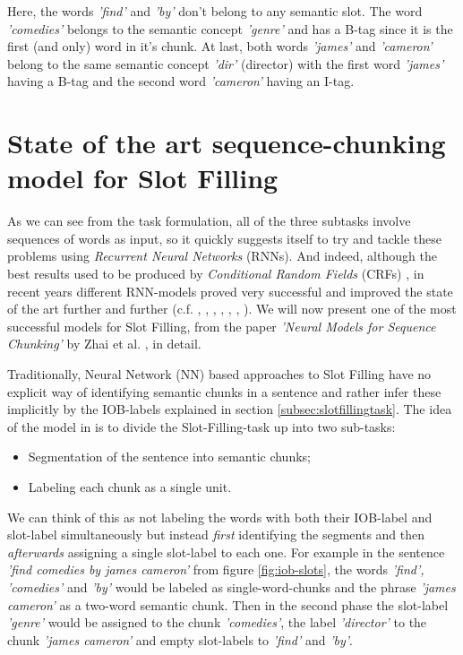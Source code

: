 \documentclass[twoside,11pt,a4paper]{article}
\theoremstyle{break}
\begin{document}
Here, the words \textit{'find'} and \textit{'by'} don't belong to any semantic slot. The word \textit{'comedies'} belongs to the semantic concept \textit{'genre'} and has a B-tag since it is the first (and only) word in it's chunk. At last, both words \textit{'james'} and \textit{'cameron'} belong to the same semantic concept \textit{'dir'} (director) with the first word \textit{'james'} having a B-tag and the second word \textit{'cameron'} having an I-tag.

%
%
%
%
\section{State of the art sequence-chunking model for Slot Filling}
As we can see from the task formulation, all of the three subtasks involve sequences of words as input, so it quickly suggests itself to try and tackle these problems using \textit{Recurrent Neural Networks} (RNNs). And indeed, although the best results used to be produced by \textit{Conditional Random Fields} (CRFs) \cite{raymond:2007}, in recent years different RNN-models proved very successful and improved the state of the art further and further (c.f. \cite{goo:2018}, \cite{kurata:2016}, \cite{mesnil:2015}, \cite{mesnil:2013}, \cite{yao:2013}, \cite{zhai:2017}, \cite{zhang:2016}). We will now present one of the most successful models for Slot Filling, from the paper \textit{'Neural Models for Sequence Chunking'} by Zhai et al. \cite{zhai:2017}, in detail.\par
Traditionally, Neural Network (NN) based approaches to Slot Filling have no explicit way of identifying semantic chunks in a sentence and rather infer these implicitly by the IOB-labels explained in section \ref{subsec:slotfillingtask}. The idea of the model in \cite{zhai:2017} is to divide the Slot-Filling-task up into two sub-tasks:
\begin{itemize}
	\item Segmentation of the sentence into semantic chunks;
	\item Labeling each chunk as a single unit.
\end{itemize}
We can think of this as not labeling the words with both their IOB-label and slot-label simultaneously but instead \textit{first} identifying the segments and then \textit{afterwards} assigning a single slot-label to each one. For example in the sentence \textit{'find comedies by james cameron'} from figure \ref{fig:iob-slots}, the words \textit{'find', 'comedies'} and \textit{'by'} would be labeled as single-word-chunks and the phrase \textit{'james cameron'} as a two-word semantic chunk. Then in the second phase the slot-label \textit{'genre'} would be assigned to the chunk \textit{'comedies'}, the label \textit{'director'} to the chunk \textit{'james cameron'} and empty slot-labels to \textit{'find'} and \textit{'by'}.\par
\end{document}
